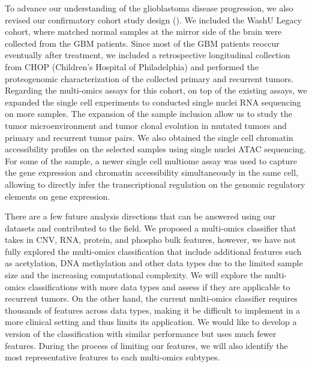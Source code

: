 To advance our understanding of the glioblastoma disease progression, we also revised our confirmatory cohort study design (). We included the WashU Legacy cohort, where matched normal samples at the mirror side of the brain were collected from the GBM patients. Since most of the GBM patients reoccur eventually after treatment, we included a retrospective longitudinal collection from CHOP (Children's Hospital of Philadelphia) and performed the proteogenomic characterization of the collected primary and recurrent tumors. Regarding the multi-omics assays for this cohort, on top of the existing assays, we expanded the single cell experiments to conducted single nuclei RNA sequencing on more samples. The expansion of the sample inclusion allow us to study the tumor microenvironment and tumor clonal evolution in  mutated tumors and primary and recurrent tumor pairs. We also obtained the single cell chromatin accessibility profiles on the selected samples using single nuclei ATAC sequencing. For some of the sample, a newer single cell multiome assay was used to capture the gene expression and chromatin accessibility simultaneously in the same cell, allowing to directly infer the transcriptional regulation on the genomic regulatory elements on gene expression.

There are a few future analysis directions that can be answered using our datasets and contributed to the field. We proposed a multi-omics classifier that takes in CNV, RNA, protein, and phospho bulk features, however, we have not fully explored the multi-omics classification that include additional features such as acetylation, DNA methylation and other data types due to the limited sample size and the increasing computational complexity. We will explore the multi-omics classifications with more data types and assess if they are applicable to recurrent tumors. On the other hand, the current multi-omics classifier requires thousands of features across data types, making it be difficult to implement in a more clinical setting and thus limits its application. We would like to develop a version of the classification with similar performance but uses much fewer features. During the process of limiting our features, we will also identify the most representative features to each multi-omics subtypes.


